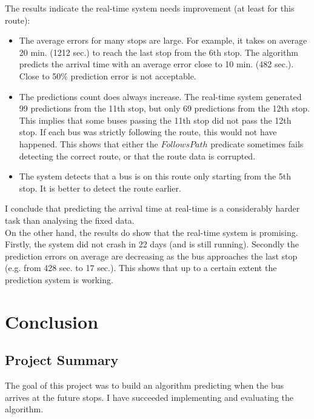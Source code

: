 \documentclass[12pt,a4paper,oneside,openright]{report}
\begin{document}
The results indicate the real-time system needs improvement (at least for this route):

\begin{itemize}
    \item The average errors for many stops are large. For example, it takes on average
    20 min. (1212 sec.) to reach the last stop from the 6th stop. The algorithm predicts the arrival
    time with an average error close to 10 min. (482 sec.).
    Close to 50\% prediction error is not acceptable.

    \item The predictions count does always increase. The real-time system generated
    99 predictions from the 11th stop, but only 69 predictions from the 12th stop. This implies
    that some buses passing the 11th stop did not pass the 12th stop. If each bus was
    strictly following the route, this would not have happened. This shows that either the
    $FollowsPath$ predicate sometimes fails detecting the correct route, or that the route data
    is corrupted.

    \item The system detects that a bus is on this route only starting from the 5th stop. It is
    better to detect the route earlier.

\end{itemize}

I conclude that predicting the arrival time at real-time is a considerably harder task than analysing
the fixed data. \\

On the other hand, the results do show that the real-time system is promising. Firstly, the system
did not crash in 22 days (and is still running). Secondly the prediction errors on average are
decreasing as the bus approaches the last stop (e.g. from 428 sec. to 17 sec.). This shows that
up to a certain extent the prediction system is working.

\chapter{Conclusion}

\section{Project Summary}

The goal of this project was to build an algorithm predicting when the bus arrives at the future stops.
I have succeeded implementing and evaluating the algorithm.
\end{document}
